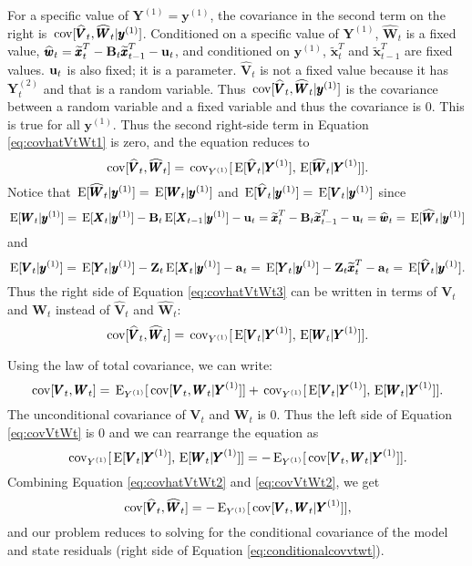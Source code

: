 \documentclass[]{article}
\def\UPS{\mbox{\boldmath $\Upsilon$}}
\def\XI{\mbox{\boldmath $\Xi$}}
\def\BB{\mbox{$\mathbf B$}}	\def\bb{\mbox{$\mathbf b$}} \def\Bb{\mbox{$\mathbf J$}} \def\Ba{\mbox{$\mathbf L$}} \def\Bm{\UPS}
\def\E{\,\textup{\textrm{E}}}
\def\VV{\mbox{$\pmb{V}$}}	\def\vv{\mbox{$\pmb{v}$}}
\def\WW{\mbox{$\pmb{W}$}}	\def\ww{\mbox{$\pmb{w}$}}
\def\XX{\mbox{$\pmb{X}$}}	\def\xx{\mbox{$\pmb{x}$}}
\def\YY{\mbox{$\pmb{Y}$}}	\def\yy{\mbox{$\pmb{y}$}}
\def\ZZ{\mbox{$\mathbf Z$}}	\def\zz{\mbox{$\mathbf z$}}	\def\Zb{\mbox{$\mathbf M$}} \def\Za{\mbox{$\mathbf N$}} \def\Zm{\XI}
\def\cov{\,\textup{\textrm{cov}}}
\def\hatxtT{\widetilde{\xx}_t^T}
\def\hatxtmT{\widetilde{\xx}_{t-1}^T}
\def\hatWt{\widehat{\WW}_t}
\def\hatwt{\widehat{\ww}_t}
\def\hatVt{\widehat{\VV}_t}
\begin{document}
For a specific value of $\YY^{(1)}=\yy^{(1)}$, the covariance in the second term on the right is $\cov[\hatVt, \hatWt|\yy^{(1)}]$. Conditioned on a specific value of $\YY^{(1)}$, $\hatWt$ is a fixed value, $\hatwt = \hatxtT - \BB_t\hatxtmT - \uu_t$, and conditioned on $\yy^{(1)}$, $\hatxtT$ and $\hatxtmT$ are fixed values. $\mbox{$\mathbf u$}_t$ is also fixed; it is a parameter. $\hatVt$ is not a fixed value because it has $\YY_t^{(2)}$ and that is a random variable.  Thus $\cov[\hatVt, \hatWt|\yy^{(1)}]$ is the covariance between a random variable and a fixed variable and thus the covariance is 0. This is true for all $\yy^{(1)}$.
Thus the second right-side term in Equation \ref{eq:covhatVtWt1} is zero, and the equation reduces to
\begin{equation}\label{eq:covhatVtWt3}
\cov[\hatVt,\hatWt] = \cov_{Y^{(1)}}[\E[\hatVt|\YY^{(1)}],\E[\hatWt|\YY^{(1)}]].
\end{equation}
Notice that $\E[\hatWt|\yy^{(1)}]=\E[\WW_t|\yy^{(1)}]$ and $\E[\hatVt|\yy^{(1)}]=\E[\VV_t|\yy^{(1)}]$ since
\begin{equation}
\E[\WW_t|\yy^{(1)}]= \E[\XX_t|\yy^{(1)}]-\BB_t\E[\XX_{t-1}|\yy^{(1)}] - \uu_t = \hatxtT-\BB_t\hatxtmT - \uu_t = \hatwt = \E[\hatWt|\yy^{(1)}]
\end{equation}
and
\begin{equation}
\E[\VV_t|\yy^{(1)}]= \E[\YY_t|\yy^{(1)}]-\ZZ_t\E[\XX_{t}|\yy^{(1)}] - \aa_t = \E[\YY_t|\yy^{(1)}]-\ZZ_t \hatxtT - \aa_t = \E[\hatVt|\yy^{(1)}] .
\end{equation}
Thus the right side of Equation \ref{eq:covhatVtWt3} can be written in terms of $\VV_t$ and $\WW_t$ instead of $\hatVt$ and $\hatWt$:
\begin{equation}\label{eq:covhatVtWt2}
\cov[\hatVt,\hatWt] = \cov_{Y^{(1)}}[\E[\VV_t|\YY^{(1)}],\E[\WW_t|\YY^{(1)}]].
\end{equation}

Using the law of total covariance, we can write:
\begin{equation}\label{eq:covVtWt}
\cov[\VV_t, \WW_t] = \E_{Y^{(1)}}[\cov[\VV_t, \WW_t|\YY^{(1)}]] + \cov_{Y^{(1)}}[\E[\VV_t|\YY^{(1)}],\E[\WW_t|\YY^{(1)}]] .
\end{equation}
The unconditional covariance of $\VV_t$ and $\WW_t$  is 0. Thus the left side of Equation \ref{eq:covVtWt} is 0 and we can rearrange the equation as
\begin{equation}\label{eq:covVtWt2}
\cov_{Y^{(1)}}[\E[\VV_t|\YY^{(1)}],\E[\WW_t|\YY^{(1)}]] = - \E_{Y^{(1)}}[\cov[\VV_t, \WW_t|\YY^{(1)}]] .
\end{equation}
Combining Equation \ref{eq:covhatVtWt2} and \ref{eq:covVtWt2}, we get
\begin{equation}\label{eq:conditionalcovvtwt}
\cov[\hatVt,\hatWt] = - \E_{Y^{(1)}}[ \cov[\VV_t, \WW_t|\YY^{(1)}] ] ,
\end{equation}
and our problem reduces to solving for the conditional covariance of the model and state residuals (right side of Equation \ref{eq:conditionalcovvtwt}).  
\end{document}
